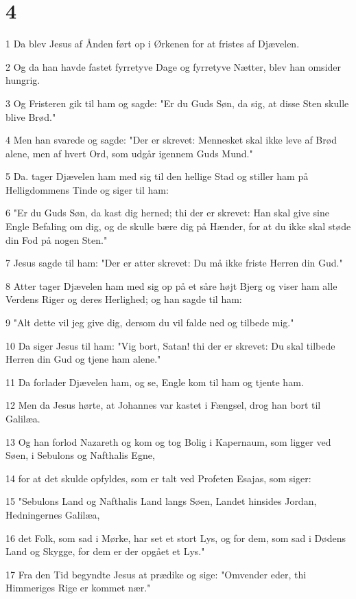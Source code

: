 \chapter{4}

\par 1 Da blev Jesus af Ånden ført op i Ørkenen for at fristes af Djævelen.
\par 2 Og da han havde fastet fyrretyve Dage og fyrretyve Nætter, blev han omsider hungrig.
\par 3 Og Fristeren gik til ham og sagde: "Er du Guds Søn, da sig, at disse Sten skulle blive Brød."
\par 4 Men han svarede og sagde: "Der er skrevet: Mennesket skal ikke leve af Brød alene, men af hvert Ord, som udgår igennem Guds Mund."
\par 5 Da. tager Djævelen ham med sig til den hellige Stad og stiller ham på Helligdommens Tinde og siger til ham:
\par 6 "Er du Guds Søn, da kast dig herned; thi der er skrevet: Han skal give sine Engle Befaling om dig, og de skulle bære dig på Hænder, for at du ikke skal støde din Fod på nogen Sten."
\par 7 Jesus sagde til ham: "Der er atter skrevet: Du må ikke friste Herren din Gud."
\par 8 Atter tager Djævelen ham med sig op på et såre højt Bjerg og viser ham alle Verdens Riger og deres Herlighed; og han sagde til ham:
\par 9 "Alt dette vil jeg give dig, dersom du vil falde ned og tilbede mig."
\par 10 Da siger Jesus til ham: "Vig bort, Satan! thi der er skrevet: Du skal tilbede Herren din Gud og tjene ham alene."
\par 11 Da forlader Djævelen ham, og se, Engle kom til ham og tjente ham.
\par 12 Men da Jesus hørte, at Johannes var kastet i Fængsel, drog han bort til Galilæa.
\par 13 Og han forlod Nazareth og kom og tog Bolig i Kapernaum, som ligger ved Søen, i Sebulons og Nafthalis Egne,
\par 14 for at det skulde opfyldes, som er talt ved Profeten Esajas, som siger:
\par 15 "Sebulons Land og Nafthalis Land langs Søen, Landet hinsides Jordan, Hedningernes Galilæa,
\par 16 det Folk, som sad i Mørke, har set et stort Lys, og for dem, som sad i Dødens Land og Skygge, for dem er der opgået et Lys."
\par 17 Fra den Tid begyndte Jesus at prædike og sige: "Omvender eder, thi Himmeriges Rige er kommet nær."
